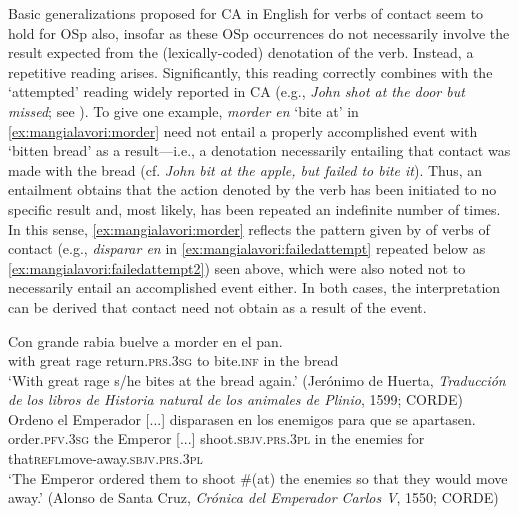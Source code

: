 \documentclass[output=paper,colorlinks,citecolor=brown,
]{langscibook}
\begin{document}
Basic generalizations proposed for CA in English for verbs of contact seem to hold for OSp also, insofar as these OSp occurrences do not necessarily involve the result expected from the (lexically-coded) denotation of the verb. Instead, a repetitive reading arises. Significantly, this reading correctly combines with the ‘attempted’ reading widely reported in CA (e.g., \textit{John shot at the door but missed}; see \citealt{Levin1993}). To give one example, \textit{morder en} ‘bite at’ in  \ref{ex:mangialavori:morder} need not entail a properly accomplished event with ‘bitten bread’ as a result—i.e., a denotation necessarily entailing that contact was made with the bread (cf. \textit{John bit at the apple, but failed to bite it}). Thus, an entailment obtains that the action denoted by the verb has been initiated to no specific result and, most likely, has been repeated an indefinite number of times. In this sense,  \ref{ex:mangialavori:morder} reflects the pattern given by of verbs of contact (e.g., \textit{disparar en} in  \ref{ex:mangialavori:failedattempt} repeated below as  \ref{ex:mangialavori:failedattempt2}) seen above, which were also noted not to necessarily entail an accomplished event either. In both cases, the interpretation can be derived that contact need not obtain as a result of the event.

\ea
  \ea\label{ex:mangialavori:morder}
    \gll Con grande rabia buelve a morder en el pan.\\
with great rage return.\textsc{prs}.\textsc{3sg} to bite.\textsc{inf} in the bread\\
    \glt ‘With great rage s/he bites at the bread again.' (Jerónimo de Huerta, \textit{Traducción de los libros de Historia natural de los animales de Plinio}, 1599; CORDE) 
  \ex\label{ex:mangialavori:failedattempt2}
    \gll Ordeno el Emperador [...] disparasen en los enemigos para que  se apartasen.\\
order.\textsc{pfv}.\textsc{3sg} the Emperor [...] shoot.\textsc{sbjv}.\textsc{prs}.\textsc{3pl} in the enemies for that\textsc{refl}move-away.\textsc{sbjv}.\textsc{prs}.\textsc{3pl}\\
    \glt ‘The Emperor ordered them to shoot \#(at) the enemies so that they would move away.’ (Alonso de Santa Cruz, \textit{Crónica del Emperador Carlos V}, 1550; CORDE) 
  \z 
\z 
\end{document}
